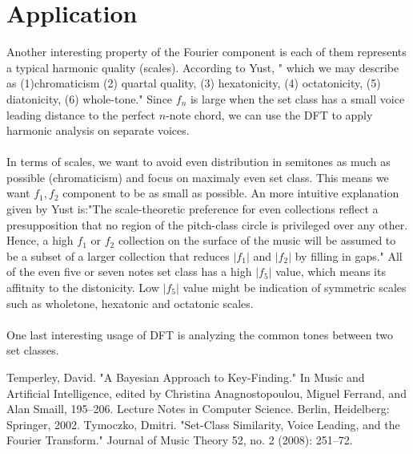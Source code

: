 \documentclass[12pt]{report}
\theoremstyle{definition}
\begin{document}
\section*{Application}
Another interesting property of the Fourier component is each of them 
represents a typical harmonic quality (scales). According to Yust, "
which we may describe as (1)chromaticism (2) quartal quality, 
(3) hexatonicity, (4) octatonicity, (5) diatonicity, (6) whole-tone."
Since $f_n$ is large when the set class has a small voice leading distance 
to the perfect $n$-note chord, we can use the DFT to apply harmonic analysis
on separate voices. 
\\\\
In terms of scales, we want to avoid even distribution in
semitones as much as possible (chromaticism) and focus on maximaly even set class.
This means we want $f_1, f_2$ component to be as small as possible. An 
more intuitive explanation given by Yust is:"The scale-theoretic 
preference for even collections reflect a presupposition that 
no region of the pitch-class circle is privileged over any other. Hence, 
a high $f_1$ or $f_2$ collection on the surface of the music will 
be assumed to be a subset of a larger collection that reduces 
$|f_1|$ and $|f_2|$ by filling in gaps." All of the even five or
seven notes set class has a high $|f_5|$ value, which means its affitnity
to the distonicity. Low $|f_5|$ value might be indication of symmetric scales
such as wholetone, hexatonic and octatonic scales.
\\\\
One last interesting usage of DFT is analyzing the common tones between two set
classes.
\begin{thebibliography}{9}

Temperley, David. "A Bayesian Approach to Key-Finding." In Music and Artificial Intelligence, edited by Christina Anagnostopoulou, Miguel Ferrand, and Alan Smaill, 195–206. Lecture Notes in Computer Science. Berlin, Heidelberg: Springer, 2002.
Tymoczko, Dmitri. "Set-Class Similarity, Voice Leading, and the Fourier Transform." Journal of Music Theory 52, no. 2 (2008): 251–72.


\end{thebibliography}
\end{document}
